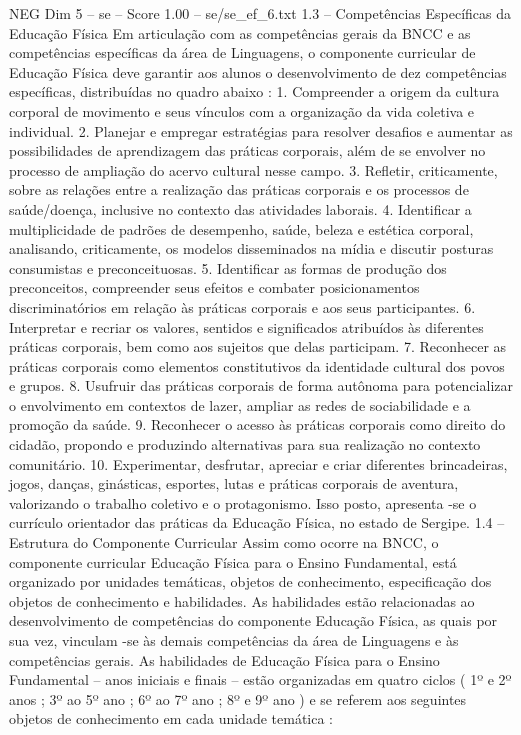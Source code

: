 \begin{textsample}{NEG Dim 5 – se – Score 1.00 – se/se\_ef\_6.txt}  \label{ex:f5_neg_160}
1.3 – Competências Específicas da Educação Física Em articulação com as competências gerais da BNCC e as competências específicas da área de Linguagens, o componente curricular de Educação Física deve garantir aos alunos o desenvolvimento de dez competências específicas, distribuídas no quadro abaixo : 1.
Compreender a origem da cultura corporal de movimento e seus vínculos com a organização da vida coletiva e individual. 2.
Planejar e empregar estratégias para resolver desafios e aumentar as possibilidades de aprendizagem das práticas corporais, além de se envolver no processo de ampliação do acervo cultural nesse campo. 3.
Refletir, criticamente, sobre as relações entre a realização das práticas corporais e os processos de saúde/doença, inclusive no contexto das atividades laborais. 4.
Identificar a multiplicidade de padrões de desempenho, saúde, beleza e estética corporal, analisando, criticamente, os modelos disseminados na mídia e discutir posturas consumistas e preconceituosas. 5.
Identificar as formas de produção dos preconceitos, compreender seus efeitos e combater posicionamentos discriminatórios em relação às práticas corporais e aos seus participantes. 6.
Interpretar e recriar os valores, sentidos e significados atribuídos às diferentes práticas corporais, bem como aos sujeitos que delas participam. 7.
Reconhecer as práticas corporais como elementos constitutivos da identidade cultural dos povos e grupos. 8.
Usufruir das práticas corporais de forma autônoma para potencializar o envolvimento em contextos de lazer, ampliar as redes de sociabilidade e a promoção da saúde. 9.
Reconhecer o acesso às práticas corporais como direito do cidadão, propondo e produzindo alternativas para sua realização no contexto comunitário. 10.
Experimentar, desfrutar, apreciar e criar diferentes brincadeiras, jogos, danças, ginásticas, esportes, lutas e práticas corporais de aventura, valorizando o trabalho coletivo e o protagonismo.
Isso posto, apresenta -se o currículo orientador das práticas da Educação Física, no estado de Sergipe. 1.4 – Estrutura do Componente Curricular Assim como ocorre na BNCC, o componente curricular Educação Física para o Ensino Fundamental, está organizado por unidades temáticas, objetos de conhecimento, especificação dos objetos de conhecimento e habilidades.
As habilidades estão relacionadas ao desenvolvimento de competências do componente Educação Física, as quais por sua vez, vinculam -se às demais competências da área de Linguagens e às competências gerais.
As habilidades de Educação Física para o Ensino Fundamental – anos iniciais e finais – estão organizadas em quatro ciclos ( 1º e 2º anos ; 3º ao 5º ano ; 6º ao 7º ano ; 8º e 9º ano ) e se referem aos seguintes objetos de conhecimento em cada unidade temática :

\end{textsample}
